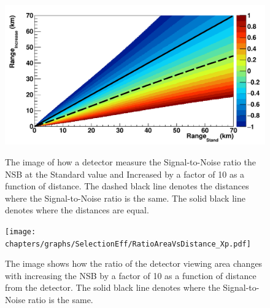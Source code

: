 \begin{figure}
\centering
\includegraphics[width=\textwidth]{chapters/graphs/SelectionEff/RangeIncreaseVsRangeStand_Xp.pdf}
\caption{The image of how a detector measure the Signal-to-Noise ratio the NSB at the Standard value and Increased by a factor of 10 as a function of distance. The dashed black line denotes the distances where the Signal-to-Noise ratio is the same. The solid black line denotes where the distances are equal.}\label{fig:RangeIncVsRangeStand}
\texttt{[image: chapters/graphs/SelectionEff/RatioAreaVsDistance\_Xp.pdf]}
\caption{The image shows how the ratio of the detector viewing area changes with increasing the NSB by a factor of 10 as a function of distance from the detector. The solid black line denotes where the Signal-to-Noise ratio is the same.}\label{fig:RatioAreaVsDistance}
\end{figure}

